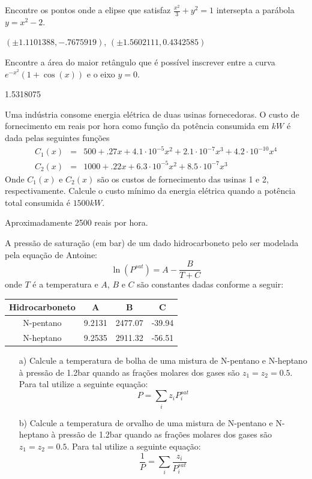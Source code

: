 \begin{Exercise} Encontre os pontos onde a elipse que satisfaz $\frac{x^2}{3}+y^2=1$ intersepta a parábola $y=x^2-2$.
\end{Exercise}
\begin{Answer}
$\left(\pm 1.1101388,-.7675919\right)$, $\left(\pm 1.5602111,0.4342585\right)$
\end{Answer}

\begin{Exercise}[title= Otimização] Encontre a área do maior retângulo que é possível inscrever entre a curva $e^{-x^2}\left(1+\cos(x)\right)$ e o eixo $y=0$.
\end{Exercise}
\begin{Answer}
1.5318075
\end{Answer}


\begin{Exercise}[title=Otimização] \label{usinas} Uma indústria consome energia elétrica de duas usinas fornecedoras. O custo de fornecimento em reais por hora como função da potência consumida em $kW$ é dada pelas seguintes funções
\begin{eqnarray*}
C_1(x)&=& 500+.27 x + 4.1\cdot 10^{-5}x^2 +2.1\cdot 10^{-7}x^3+4.2\cdot 10^{-10}x^4 \\
C_2(x)&=& 1000+.22 x + 6.3\cdot 10^{-5}x^2 +8.5\cdot 10^{-7}x^3
\end{eqnarray*}
Onde $C_1(x)$ e $C_2(x)$ são os custos de fornecimento das usinas 1 e 2, respectivamente. Calcule o custo mínimo da energia elétrica quando a potência total consumida é  $1500kW$.

\end{Exercise}
\begin{Answer}
 Aproximadamente 2500 reais por hora.
\end{Answer}

\begin{Exercise}[title= Termodinâmica] A pressão de saturação (em bar) de um dado hidrocarboneto pelo ser modelada pela equação de Antoine:
$$\ln\left(P^{sat}\right)=A-\frac{B}{T+C}$$
onde $T$ é a temperatura e $A$, $B$ e $C$ são constantes dadas conforme a seguir:

\begin{tabular}{|c|c|c|c|}
\hline
Hidrocarboneto&A&B&C\\
\hline
N-pentano & 9.2131 & 2477.07 & -39.94 \\
\hline
N-heptano & 9.2535 &2911.32 &-56.51 \\
\hline
\end{tabular}
\begin{itemize}
\item[a)] Calcule a temperatura de bolha de uma mistura de N-pentano e N-heptano à pressão de 1.2bar quando as frações molares  dos gases são  $z_1=z_2=0.5$. Para tal utilize a seguinte equação:
$$P=\sum_i z_i P_i^{sat}$$
\item[b)] Calcule a temperatura de orvalho de uma mistura de N-pentano e N-heptano à pressão de 1.2bar quando as frações molares  dos gases são  $z_1=z_2=0.5$. Para tal utilize a seguinte equação:
$$\frac{1}{P}=\sum_i \frac{z_i}{P_i^{sat}}$$
\end{itemize}
\end{Exercise}

